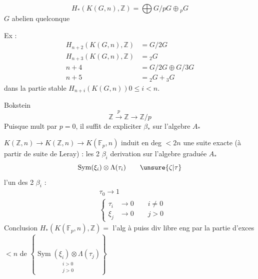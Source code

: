 \[
H_*(K(G,n),\mathbb Z)=\bigoplus G/pG\oplus {}_pG
\]
$G$ abelien quelconque

Ex :
\[
\left.\begin{aligned}
H_{n+2}(K(G,n),\mathbb Z)&=G/2G\\
H_{n+3}(K(G,n),\mathbb Z)&={}_2G\\
n+4\qquad &=G/2G\oplus G/3G\\
n+5\qquad &={}_2G+{}_3G
\end{aligned}\right.
\]
dans la partie stable $H_{n+i}(K(G,n))$\quad $0\leq i<n$.

Bokstein
\[
\mathbb Z\xrightarrow{p}\mathbb Z\longrightarrow\mathbb Z/p
\]
Puisque mult par $p=0$, il suffit de  expliciter $\beta_*$ sur l'algebre $A_*$

 $K(\mathbb Z,n)\longrightarrow K(\mathbb Z,n)\longrightarrow K(\mathbb F_p,n)$ induit en deg $<2n$ une suite exacte (à partir de suite de Leray) :
les 2 $\beta_i$   derivation sur l'algebre graduée $A_*$
\[
\operatorname{Sym}(\xi_i)\otimes\Lambda(\tau_i)\qquad\unsure{\zeta|\tau}
\]
l'un des 2 $\beta_i$ :
\[
\begin{aligned}
&\tau_0\longrightarrow1\\
&\left\{\begin{aligned}\tau_i&\longrightarrow0\qquad i\ne0\\
\xi_j&\longrightarrow0\qquad j>0\end{aligned}\right.
\end{aligned}
\]
Conclusion \quad $H_*(K(\mathbb F_p,n),\mathbb Z)={}$  l'alg à puiss div libre eng par la partie d'exces $<n$ de
$\left\{\underset{\substack{i>0\\j>0}}{\operatorname{Sym}(\xi_i)\otimes\Lambda(\tau_j)}\right\}$

